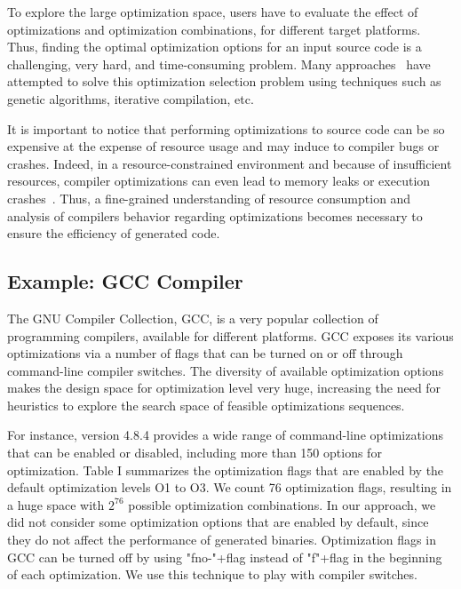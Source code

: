 To explore the large optimization space, users have to evaluate the effect of optimizations and optimization combinations, for different target platforms. 
Thus, finding the optimal optimization options for an input source code is a challenging, very hard, and time-consuming problem. 
Many approaches~\cite{hoste2008cole,zhong2009tuning,sandran2012genetic,martins2014exploration} have attempted to solve this optimization selection problem using techniques such as genetic algorithms, iterative compilation, etc.

It is important to notice that performing optimizations to source code can be so expensive at the expense of resource usage and may induce to compiler bugs or crashes. 
Indeed, in a resource-constrained environment and because of insufficient resources, compiler optimizations can even lead to memory leaks or execution crashes~\cite{yang2011finding}. 
Thus, a fine-grained understanding of resource consumption and analysis of compilers behavior regarding optimizations becomes necessary to ensure the efficiency of generated code.

\subsection{Example: GCC Compiler}

The GNU Compiler Collection, GCC, is a very popular collection of programming compilers, available for different platforms.
GCC exposes its various optimizations via a number of flags that can be turned on or off through command-line compiler switches. 
The diversity of available optimization options makes the design space for optimization level very huge, increasing the need for heuristics to explore the search space of feasible optimizations sequences.


For instance, version 4.8.4 provides a wide range of command-line optimizations that can be enabled or disabled, including more than 150 options for optimization. 
Table I summarizes the optimization flags that are enabled by the default optimization levels O1 to O3.
We count 76 optimization flags, resulting in a huge space with $2^{76}$ possible optimization combinations.
In our approach, we did not consider some optimization options that are enabled by default, since they do not affect the performance of generated binaries.
Optimization flags in GCC can be turned off by using "fno-"+flag instead of "f"+flag in the beginning of each optimization. 
We use this technique to play with compiler switches.

